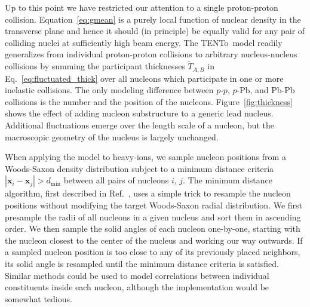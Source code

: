 \documentclass[aps,prc,reprint,amsmath,nofootinbib]{revtex4-1}
\newcommand{\trento}{T\raisebox{-0.5ex}{R}ENTo}
\newcommand{\T}{\tilde{T}}
\newcommand{\xv}{\mathbf x}
\begin{document}
Up to this point we have restricted our attention to a single proton-proton collision.
Equation~\eqref{eq:gmean} is a purely local function of nuclear density in the transverse plane and hence it should (in principle) be equally valid for any pair of colliding nuclei at sufficiently high beam energy.
The \trento\ model readily generalizes from individual proton-proton collisions to arbitrary nucleus-nucleus collisions by summing the participant thicknesses $\T_{A,B}$ in Eq.~\eqref{eq:fluctuated_thick} over all nucleons which participate in one or more inelastic collisions.
The only modeling difference between $p$-$p$, $p$-Pb, and Pb-Pb collisions is the number and the position of the nucleons.
Figure~\ref{fig:thickness} shows the effect of adding nucleon substructure to a generic lead nucleus.
Additional fluctuations emerge over the length scale of a nucleon, but the macroscopic geometry of the nucleus is largely unchanged.

When applying the model to heavy-ions, we sample nucleon positions from a Woods-Saxon density distribution subject to a minimum distance criteria $|\xv_i - \xv_j| > d_\mathrm{min}$ between all pairs of nucleons $i$, $j$.
The minimum distance algorithm, first described in Ref.~\cite{Bernhard:2018hnz}, uses a simple trick to resample the nucleon positions without modifying the target Woods-Saxon radial distribution.
We first presample the radii of all nucleons in a given nucleus and sort them in ascending order.
We then sample the solid angles of each nucleon one-by-one, starting with the nucleon closest to the center of the nucleus and working our way outwards.
If a sampled nucleon position is too close to any of its previously placed neighbors, its solid angle is resampled until the minimum distance criteria is satisfied.
Similar methods could be used to model correlations between individual constituents inside each nucleon, although the implementation would be somewhat tedious.
\end{document}
